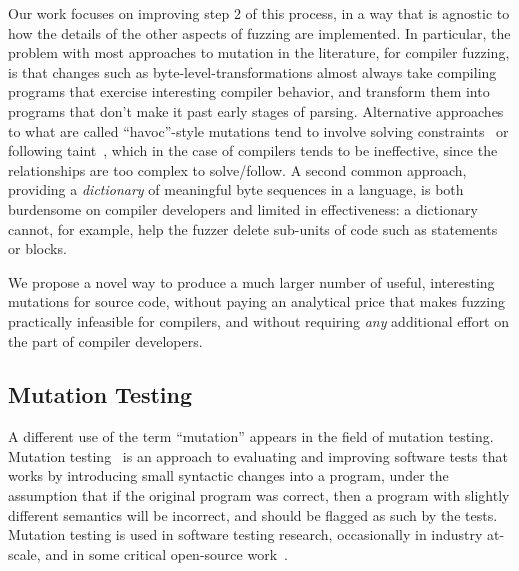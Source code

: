 Our work focuses on improving step 2 of this process, in a way that is agnostic to how the details of the other aspects of fuzzing are implemented.  In particular, the problem with most approaches to mutation in the literature, for compiler fuzzing, is that changes such as byte-level-transformations almost always take compiling programs that exercise interesting compiler behavior, and transform them into programs that don't make it past early stages of parsing.  Alternative approaches to what are called ``havoc''-style mutations tend to involve solving constraints~\cite{Eclipser} or following taint~\cite{Angora}, which in the case of compilers tends to be ineffective, since the relationships are too complex to solve/follow.  A second common approach, providing a \emph{dictionary} of meaningful byte sequences in a language, is both burdensome on compiler developers and limited in effectiveness: a dictionary cannot, for example, help the fuzzer delete sub-units of code such as statements or blocks.

We propose a novel way to produce a much larger number of useful, interesting mutations for source code, without paying an analytical price that makes fuzzing practically infeasible for compilers, and without requiring \emph{any} additional effort on the part of compiler developers.

\subsection{Mutation Testing}

A different use of the term ``mutation'' appears in the field of mutation testing.  Mutation testing~\cite{MutationSurvey,budd1979mutation,demillo1978hints} is an approach to evaluating and improving software tests that works by introducing small syntactic changes into a program, under the assumption that if the original program was correct, then a program with slightly different semantics will be incorrect, and should be flagged as such by the tests.  Mutation testing is used in software testing research, occasionally in industry at-scale, and in some critical  open-source work~\cite{mutKernel,mutGoogle,mutFacebook}.

